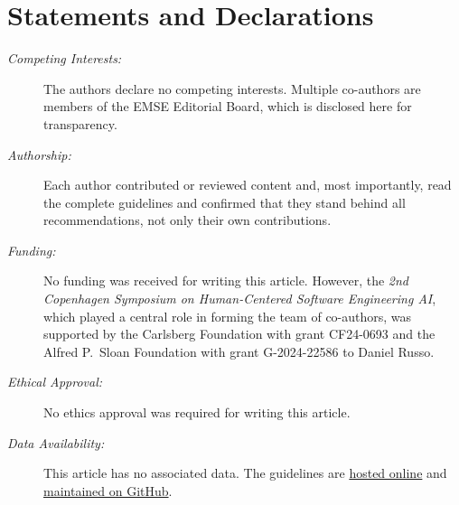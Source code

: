 \documentclass[smallextended]{svjour3}
\begin{document}
\section{Statements and Declarations}

\begin{description}
\item[\textit{Competing Interests:}] The authors declare no competing interests. Multiple co-authors are members of the EMSE Editorial Board, which is disclosed here for transparency.
\item[\textit{Authorship:}] Each author contributed or reviewed content and, most importantly, read the complete guidelines and confirmed that they stand behind all recommendations, not only their own contributions.
\item[\textit{Funding:}] No funding was received for writing this article. However, the \emph{2nd Copenhagen Symposium on Human-Centered Software Engineering AI}, which played a central role in forming the team of co-authors, was supported by the Carlsberg Foundation with grant CF24-0693 and the Alfred P.\ Sloan Foundation with grant G-2024-22586 to Daniel Russo.
\item[\textit{Ethical Approval:}] No ethics approval was required for writing this article.
\item[\textit{Data Availability:}] This article has no associated data. The guidelines are \href{https://llm-guidelines.org/}{hosted online} and \href{https://github.com/se-uhd/llm-guidelines-website}{maintained on GitHub}.
\end{description}



\end{document}
